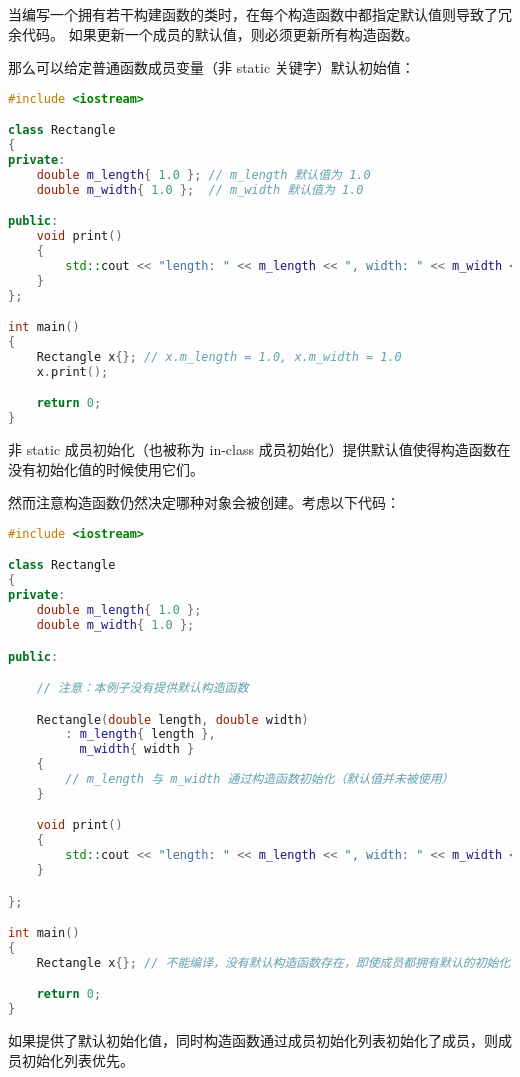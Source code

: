 \documentclass[../../LearnCpp.tex]{subfiles}
\begin{document}

当编写一个拥有若干构建函数的类时，在每个构造函数中都指定默认值则导致了冗余代码。
如果更新一个成员的默认值，则必须更新所有构造函数。

那么可以给定普通函数成员变量（非 static 关键字）默认初始值：

\begin{lstlisting}[language=C++]
#include <iostream>

class Rectangle
{
private:
    double m_length{ 1.0 }; // m_length 默认值为 1.0
    double m_width{ 1.0 };  // m_width 默认值为 1.0

public:
    void print()
    {
        std::cout << "length: " << m_length << ", width: " << m_width << '\n';
    }
};

int main()
{
    Rectangle x{}; // x.m_length = 1.0, x.m_width = 1.0
    x.print();

    return 0;
}
\end{lstlisting}

非 static 成员初始化（也被称为 in-class 成员初始化）提供默认值使得构造函数在没有初始化值的时候使用它们。

然而注意构造函数仍然决定哪种对象会被创建。考虑以下代码：

\begin{lstlisting}[language=C++]
#include <iostream>

class Rectangle
{
private:
    double m_length{ 1.0 };
    double m_width{ 1.0 };

public:

    // 注意：本例子没有提供默认构造函数

    Rectangle(double length, double width)
        : m_length{ length },
          m_width{ width }
    {
        // m_length 与 m_width 通过构造函数初始化（默认值并未被使用）
    }

    void print()
    {
        std::cout << "length: " << m_length << ", width: " << m_width << '\n';
    }

};

int main()
{
    Rectangle x{}; // 不能编译，没有默认构造函数存在，即使成员都拥有默认的初始化值

    return 0;
}
\end{lstlisting}

如果提供了默认初始化值，同时构造函数通过成员初始化列表初始化了成员，则成员初始化列表优先。
\end{document}
